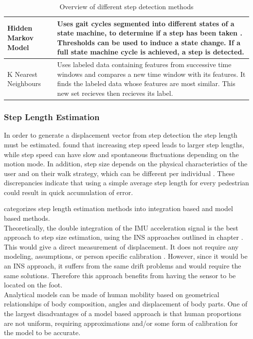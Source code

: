 \begin{table}[h]
\begin{tabularx}{\linewidth}{@{} P{17mm} L}
  Hidden Markov Model & Uses gait cycles segmented into different states of a state machine, to determine if a step has been taken \cite{Ren2016a}. Thresholds can be used to induce a state change. If a full state machine cycle is achieved, a step is detected.\\ \hline
  K Nearest Neighbours & Uses labeled data containing features from successive time windows and compares a new time window with its features. It finds the labeled data whose features are most similar. This new set recieves then recieves its label. \\
			\bottomrule
\end{tabularx}
		\caption{Overview of different step detection methods}
		\label{tab:step_detection_comparison}
\end{table}
\restoregeometry


\subsubsection{Step Length Estimation}
In order to generate a displacement vector from step detection the step length must be estimated. \citet{Collins2013a} found that increasing step speed leads to larger step lengths, while step speed can have slow and spontaneous fluctuations depending on the motion mode. In addition, step size depends on the physical characteristics of the user and on their walk strategy, which can be different per individual \cite{Diez2018}. These discrepancies indicate that using a simple average step length for every pedestrian could result in quick accumulation of error. 

\citet{Diez2018} categorizes step length estimation methods into integration based and model based methods. \\
Theoretically, the double integration of the IMU acceleration signal is the best approach to step size estimation, using the INS approaches outlined in chapter . This would give a direct measurement of displacement. It does not require any modeling, assumptions, or person specific calibration \cite{Diez2018}. However, since it would be an INS approach, it suffers from the same drift problems and would require the same solutions. Therefore this approach benefits from having the sensor to be located on the foot. \\
Analytical models can be made of human mobility based on geometrical relationships of body composition, angles and displacement of body parts. One of the largest disadvantages of a model based approach is that human proportions are not uniform, requiring approximations and/or some form of calibration for the model to be accurate.


